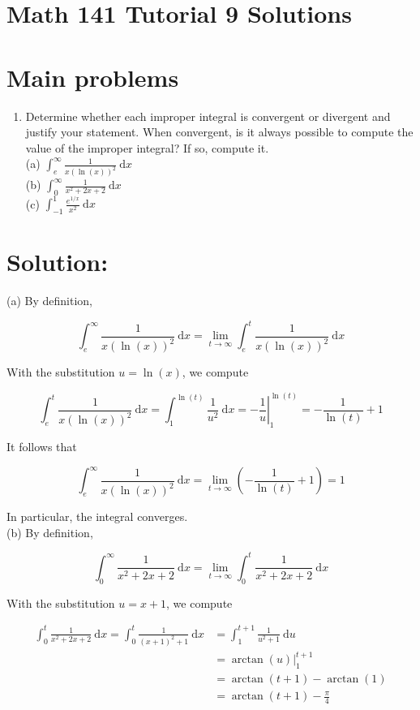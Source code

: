 \documentclass[10pt]{article}
\begin{document}
\section*{Math 141 Tutorial 9 Solutions}
\section*{Main problems}
\begin{enumerate}
  \item Determine whether each improper integral is convergent or divergent and justify your statement. When convergent, is it always possible to compute the value of the improper integral? If so, compute it.\\
(a) $\int_{e}^{\infty} \frac{1}{x(\ln (x))^{2}} \mathrm{~d} x$\\
(b) $\int_{0}^{\infty} \frac{1}{x^{2}+2 x+2} \mathrm{~d} x$\\
(c) $\int_{-1}^{1} \frac{e^{1 / x}}{x^{2}} \mathrm{~d} x$
\end{enumerate}

\section*{Solution:}
(a) By definition,

$$
\int_{e}^{\infty} \frac{1}{x(\ln (x))^{2}} \mathrm{~d} x=\lim _{t \rightarrow \infty} \int_{e}^{t} \frac{1}{x(\ln (x))^{2}} \mathrm{~d} x
$$

With the substitution $u=\ln (x)$, we compute

$$
\int_{e}^{t} \frac{1}{x(\ln (x))^{2}} \mathrm{~d} x=\int_{1}^{\ln (t)} \frac{1}{u^{2}} \mathrm{~d} x=-\left.\frac{1}{u}\right|_{1} ^{\ln (t)}=-\frac{1}{\ln (t)}+1
$$

It follows that

$$
\int_{e}^{\infty} \frac{1}{x(\ln (x))^{2}} \mathrm{~d} x=\lim _{t \rightarrow \infty}\left(-\frac{1}{\ln (t)}+1\right)=1
$$

In particular, the integral converges.\\
(b) By definition,

$$
\int_{0}^{\infty} \frac{1}{x^{2}+2 x+2} \mathrm{~d} x=\lim _{t \rightarrow \infty} \int_{0}^{t} \frac{1}{x^{2}+2 x+2} \mathrm{~d} x
$$

With the substitution $u=x+1$, we compute

$$
\begin{aligned}
\int_{0}^{t} \frac{1}{x^{2}+2 x+2} \mathrm{~d} x=\int_{0}^{t} \frac{1}{(x+1)^{2}+1} \mathrm{~d} x & =\int_{1}^{t+1} \frac{1}{u^{2}+1} \mathrm{~d} u \\
& =\left.\arctan (u)\right|_{1} ^{t+1} \\
& =\arctan (t+1)-\arctan (1) \\
& =\arctan (t+1)-\frac{\pi}{4}
\end{aligned}
$$
\end{document}
